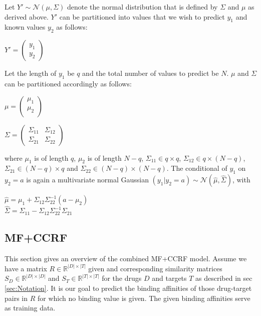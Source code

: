 Let $Y' \sim \mathcal{N}(\mu, \Sigma)$ denote the normal distribution that is defined by $\Sigma$ and $\mu$ as derived above.
$Y'$ can be partitioned into values that we wish to predict $y_1$ and known values $y_2$ as follows:
\begin{center}
$Y' = \begin{pmatrix}
y_1 \\
y_2
\end{pmatrix}$
\end{center}
Let the length of $y_1$ be $q$ and the total number of values to predict be $N$. $\mu$ and $\Sigma$ can be partitioned accordingly as follows:
\begin{center}
$\mu=\begin{pmatrix}
\mu_1\\
\mu_2\\
\end{pmatrix}$
\end{center}
\begin{center}
$\Sigma = \begin{pmatrix}
\Sigma_{11} & \Sigma_{12} \\
\Sigma_{21} & \Sigma_{22}
\end{pmatrix}$
\end{center}
where $\mu_1$ is of length $q$, $\mu_2$ is of length $N-q$, $\Sigma_{11}\in q \times q$, $\Sigma_{12} \in q \times (N-q)$, $\Sigma_{21} \in (N-q) \times q$ and $\Sigma_{22} \in (N-q) \times (N-q)$. The conditional of $y_1$ on $y_2=a$ is again a multivariate normal Gaussian $(y_1 | y_2 = a) \sim \mathcal{N} (\hat{\mu}, \hat{\Sigma})$, with
\begin{center}
$\hat{\mu} = \mu_1 + \Sigma_{12}\Sigma_{22}^{-1}(a-\mu_2)$\\
$\hat{\Sigma} = \Sigma_{11} - \Sigma_{12}\Sigma_{22}^{-1}\Sigma_{21}$
\end{center}


\subsection{MF+CCRF}
\label{sec:MFCCRF}

This section gives an overview of the combined MF+CCRF model. Assume we have a matrix $R \in \mathbb{R} ^{|D| \times |T|}$ given and corresponding similarity matrices $S_D \in \mathbb{R}^{|D| \times |D|}$ and $S_T \in \mathbb{R}^{|T| \times |T|}$ for the drugs $D$ and targets $T$ as described in sec \ref{sec:Notation}. It is our goal to predict the binding affinities of those drug-target pairs in $R$ for which no binding value is given. The given binding affinities serve as training data.


